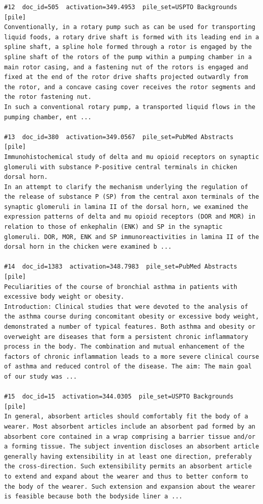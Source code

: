 \begin{verbatim}
#12  doc_id=505  activation=349.4953  pile_set=USPTO Backgrounds  [pile]
Conventionally, in a rotary pump such as can be used for transporting liquid foods, a rotary drive shaft is formed with its leading end in a spline shaft, a spline hole formed through a rotor is engaged by the spline shaft of the rotors of the pump within a pumping chamber in a main rotor casing, and a fastening nut of the rotors is engaged and fixed at the end of the rotor drive shafts projected outwardly from the rotor, and a concave casing cover receives the rotor segments and the rotor fastening nut.
In such a conventional rotary pump, a transported liquid flows in the pumping chamber, ent ...

#13  doc_id=380  activation=349.0567  pile_set=PubMed Abstracts  [pile]
Immunohistochemical study of delta and mu opioid receptors on synaptic glomeruli with substance P-positive central terminals in chicken dorsal horn.
In an attempt to clarify the mechanism underlying the regulation of the release of substance P (SP) from the central axon terminals of the synaptic glomeruli in lamina II of the dorsal horn, we examined the expression patterns of delta and mu opioid receptors (DOR and MOR) in relation to those of enkephalin (ENK) and SP in the synaptic glomeruli. DOR, MOR, ENK and SP immunoreactivities in lamina II of the dorsal horn in the chicken were examined b ...

#14  doc_id=1383  activation=348.7983  pile_set=PubMed Abstracts  [pile]
Peculiarities of the course of bronchial asthma in patients with excessive body weight or obesity.
Introduction: Clinical studies that were devoted to the analysis of the asthma course during concomitant obesity or excessive body weight, demonstrated a number of typical features. Both asthma and obesity or overweight are diseases that form a persistent chronic inflammatory process in the body. The combination and mutual enhancement of the factors of chronic inflammation leads to a more severe clinical course of asthma and reduced control of the disease. The aim: The main goal of our study was ...

#15  doc_id=15  activation=344.0305  pile_set=USPTO Backgrounds  [pile]
In general, absorbent articles should comfortably fit the body of a wearer. Most absorbent articles include an absorbent pad formed by an absorbent core contained in a wrap comprising a barrier tissue and/or a forming tissue. The subject invention discloses an absorbent article generally having extensibility in at least one direction, preferably the cross-direction. Such extensibility permits an absorbent article to extend and expand about the wearer and thus to better conform to the body of the wearer. Such extension and expansion about the wearer is feasible because both the bodyside liner a ...


\end{verbatim}
